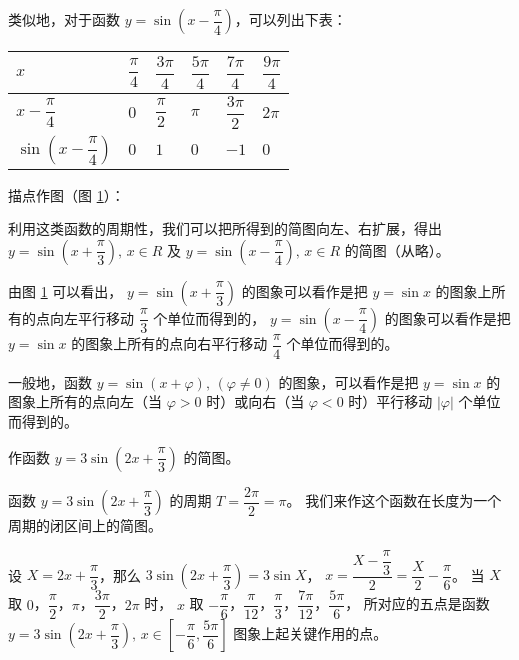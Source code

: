 类似地，对于函数 $y = \sin \left( x - \dfrac \pi 4 \right)$，可以列出下表：

\begin{table}[H]
\renewcommand\arraystretch{2}
\begin{tabular}{|w{c}{8em}|*{5}{w{c}{3em}|}}
    \hline
    $x$ & $\dfrac \pi 4$ & $\dfrac{3\pi}{4}$ & $\dfrac{5\pi}{4}$ & $\dfrac{7\pi}{4}$ & $\dfrac{9\pi}{4}$ \\ \hline
    $x - \dfrac \pi 4$ & $0$ & $\dfrac \pi 2$ & $\pi$ & $\dfrac{3\pi}{2}$ & $2\pi$ \\ \hline
    $\sin \left( x - \dfrac \pi 4 \right)$ & $0$ & $1$ & $0$ & $-1$ & $0$ \\ \hline
\end{tabular}
\end{table}

描点作图（图 \ref{fig:2-25}）：

\begin{figure}[htbp]
    \centering
    
    \caption{}\label{fig:2-25}
\end{figure}

利用这类函数的周期性，我们可以把所得到的简图向左、右扩展，得出
$y = \sin \left( x + \dfrac \pi 3 \right), \, x \in R$ 及
$y = \sin \left( x - \dfrac \pi 4 \right), \, x \in R$ 的简图（从略）。
\vspace{0.5em}

由图 \ref{fig:2-25} 可以看出，
$y = \sin \left( x + \dfrac \pi 3 \right)$ \vspace{0.5em} 的图象可以看作是把 $y = \sin x$ 的图象上所有的点向左平行移动 $\dfrac \pi 3$ 个单位而得到的，
$y = \sin \left( x - \dfrac \pi 4 \right)$ \vspace{0.5em} 的图象可以看作是把 $y = \sin x$ 的图象上所有的点向右平行移动 $\dfrac \pi 4$ 个单位而得到的。
\vspace{0.5em}

一般地，函数 $y = \sin(x + \varphi), \, (\varphi \neq 0)$ 的图象，可以看作是把 $y = \sin x$
的图象上所有的点向左（当 $\varphi > 0 $ 时）或向右（当 $\varphi < 0$ 时）平行移动 $|\varphi|$ 个单位而得到的。

\vspace{0.5em}
\liti 作函数 $y = 3\sin \left( 2x + \dfrac \pi 3 \right)$ 的简图。
\vspace{0.5em}

\jie 函数 $y = 3\sin \left( 2x + \dfrac \pi 3 \right)$ 的周期 $T = \dfrac{2\pi}{2} = \pi$。
我们来作这个函数在长度为一个周期的闭区间上的简图。

设 $X = 2x + \dfrac \pi 3$，那么 $3\sin(2x + \dfrac \pi 3) = 3\sin X$，
$x = \dfrac{X - \dfrac \pi 3}{2} = \dfrac X 2 - \dfrac \pi 6$。
当 $X$ 取 $0$，$\dfrac \pi 2$，$\pi$，$\dfrac{3\pi}{2}$，$2\pi$ 时，
$x$ 取 $-\dfrac \pi 6$，$\dfrac{\pi}{12}$，$\dfrac{\pi}{3}$，$\dfrac{7\pi}{12}$，$\dfrac{5\pi}{6}$，
所对应的五点是函数 $y = 3\sin \left( 2x + \dfrac \pi 3 \right), \, x \in \left[ -\dfrac \pi 6, \dfrac{5\pi}{6} \right]$
图象上起关键作用的点。

